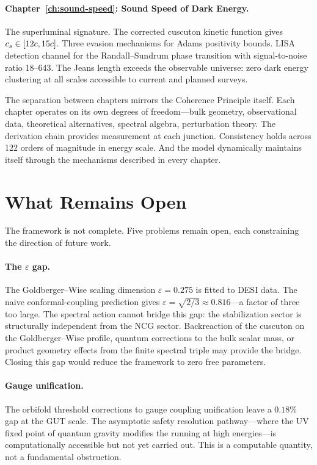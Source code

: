 \paragraph{Chapter~\ref{ch:sound-speed}: Sound Speed of Dark Energy.}
The superluminal signature. The corrected cuscuton kinetic function
gives $c_s \in [12c, 15c]$. Three evasion mechanisms for Adams
positivity bounds. LISA detection channel for the Randall--Sundrum
phase transition with signal-to-noise ratio 18--643. The Jeans length
exceeds the observable universe: zero dark energy clustering at all
scales accessible to current and planned surveys.

\medskip

The separation between chapters mirrors the Coherence Principle
itself. Each chapter operates on its own degrees of freedom---bulk
geometry, observational data, theoretical alternatives, spectral
algebra, perturbation theory. The derivation chain provides
measurement at each junction. Consistency holds across 122 orders of
magnitude in energy scale. And the model dynamically maintains itself
through the mechanisms described in every chapter.

\section{What Remains Open}
\label{sec:0-open}

The framework is not complete. Five problems remain open, each
constraining the direction of future work.

\paragraph{The $\varepsilon$ gap.}
The Goldberger--Wise scaling dimension $\varepsilon = 0.275$ is fitted
to DESI data. The naive conformal-coupling prediction gives
$\varepsilon = \sqrt{2/3} \approx 0.816$---a factor of three too
large. The spectral action cannot bridge this gap: the stabilization
sector is structurally independent from the NCG sector. Backreaction
of the cuscuton on the Goldberger--Wise profile, quantum corrections
to the bulk scalar mass, or product geometry effects from the finite
spectral triple may provide the bridge. Closing this gap would reduce
the framework to zero free parameters.

\paragraph{Gauge unification.}
The orbifold threshold corrections to gauge coupling unification leave
a $0.18\%$ gap at the GUT scale. The asymptotic safety resolution
pathway---where the UV fixed point of quantum gravity modifies the
running at high energies---is computationally accessible but not yet
carried out. This is a computable quantity, not a fundamental
obstruction.

